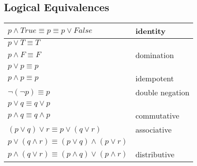 \documentclass{../cheatsheet}
\begin{document}
\begin{multicols*}{2}
    \section{Logical Equivalences}
    \begin{tabularx}{\columnwidth}{l| l}
        \hline
        $p \wedge True \equiv p \equiv p \vee False$ & identity \\
        \hline
        $p \vee T \equiv T$ \\ $p \wedge F \equiv F$ & domination \\
        \hline
        $p \vee p \equiv p$ \\ $p \wedge p \equiv p$ & idempotent \\
        \hline
        $\neg(\neg p) \equiv p$ & double negation \\
        \hline
        $p \vee q \equiv q \vee p$ \\$p\wedge q \equiv q \wedge p$ & commutative\\
        \hline
        $(p \vee q) \vee r \equiv p \vee (q \vee r)$ & associative \\
        \hline
        $p \vee (q \wedge r) \equiv (p \vee q) \wedge (p \vee r)$ \\
        $p \wedge (q \vee r) \equiv (p \wedge q) \vee (p \wedge r)$ &
        distributive \\
        \hline

    \end{tabularx}
\end{multicols*}
\end{document}
